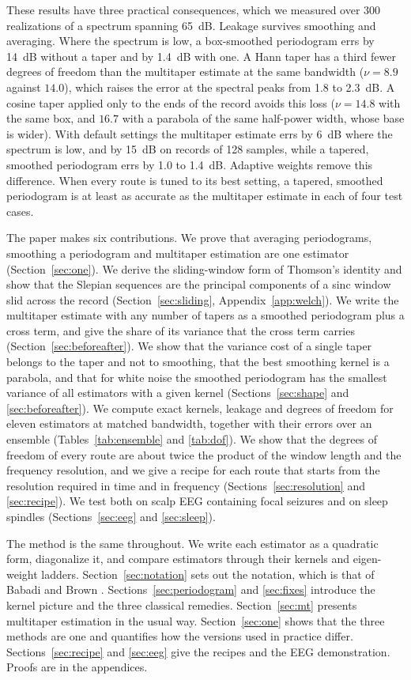 \documentclass[10pt,twocolumn]{article}
\begin{document}
These results have three practical consequences, which we measured over 300 realizations of a spectrum spanning 65~dB. Leakage survives smoothing and averaging. Where the spectrum is low, a box-smoothed periodogram errs by 14~dB without a taper and by 1.4~dB with one. A Hann taper has a third fewer degrees of freedom than the multitaper estimate at the same bandwidth ($\nu=8.9$ against $14.0$), which raises the error at the spectral peaks from 1.8 to 2.3~dB. A cosine taper applied only to the ends of the record avoids this loss ($\nu=14.8$ with the same box, and $16.7$ with a parabola of the same half-power width, whose base is wider). With default settings the multitaper estimate errs by 6~dB where the spectrum is low, and by 15~dB on records of 128 samples, while a tapered, smoothed periodogram errs by 1.0 to 1.4~dB. Adaptive weights remove this difference. When every route is tuned to its best setting, a tapered, smoothed periodogram is at least as accurate as the multitaper estimate in each of four test cases.

The paper makes six contributions. We prove that averaging periodograms, smoothing a periodogram and multitaper estimation are one estimator (Section~\ref{sec:one}). We derive the sliding-window form of Thomson's identity and show that the Slepian sequences are the principal components of a sinc window slid across the record (Section~\ref{sec:sliding}, Appendix~\ref{app:welch}). We write the multitaper estimate with any number of tapers as a smoothed periodogram plus a cross term, and give the share of its variance that the cross term carries (Section~\ref{sec:beforeafter}). We show that the variance cost of a single taper belongs to the taper and not to smoothing, that the best smoothing kernel is a parabola, and that for white noise the smoothed periodogram has the smallest variance of all estimators with a given kernel (Sections~\ref{sec:shape} and \ref{sec:beforeafter}). We compute exact kernels, leakage and degrees of freedom for eleven estimators at matched bandwidth, together with their errors over an ensemble (Tables~\ref{tab:ensemble} and \ref{tab:dof}). We show that the degrees of freedom of every route are about twice the product of the window length and the frequency resolution, and we give a recipe for each route that starts from the resolution required in time and in frequency (Sections~\ref{sec:resolution} and \ref{sec:recipe}). We test both on scalp EEG containing focal seizures and on sleep spindles (Sections~\ref{sec:eeg} and \ref{sec:sleep}).

The method is the same throughout. We write each estimator as a quadratic form, diagonalize it, and compare estimators through their kernels and eigen-weight ladders. Section~\ref{sec:notation} sets out the notation, which is that of Babadi and Brown \cite{babadi2014}. Sections~\ref{sec:periodogram} and \ref{sec:fixes} introduce the kernel picture and the three classical remedies. Section~\ref{sec:mt} presents multitaper estimation in the usual way. Section~\ref{sec:one} shows that the three methods are one and quantifies how the versions used in practice differ. Sections~\ref{sec:recipe} and \ref{sec:eeg} give the recipes and the EEG demonstration. Proofs are in the appendices.
\end{document}
